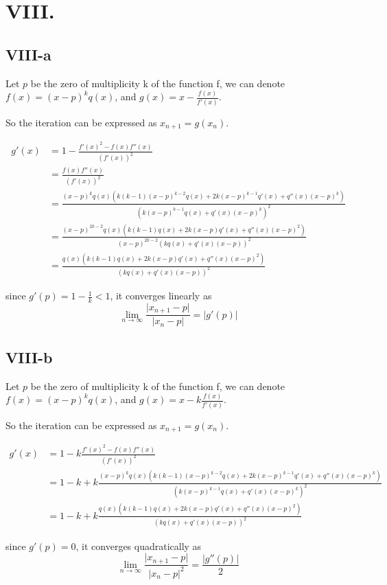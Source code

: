 \documentclass[a4paper]{article}
\begin{document}
\section*{VIII.}
\subsection*{VIII-a}
Let $p$ be the zero of multiplicity k of the function f, we can denote $f(x)=(x-p)^{k}q(x)$, and $g(x)=x-\frac{f(x)}{f'(x)}$.

So the iteration can be expressed as $x_{n+1}=g(x_{n})$.

$$
\begin{aligned}
g'(x)
&= 1-\frac{f'(x)^2-f(x)f''(x)}{(f'(x))^2} \\
&= \frac{f(x)f''(x)}{(f'(x))^2} \\
&= \frac{(x-p)^{k}q(x)(k(k-1)(x-p)^{k-2}q(x)+2k(x-p)^{k-1}q'(x)+q''(x)(x-p)^k)}{(k(x-p)^{k-1}q(x)+q'(x)(x-p)^k)^2} \\
&= \frac{(x-p)^{2k-2}q(x)(k(k-1)q(x)+2k(x-p)q'(x)+q''(x)(x-p)^2)}{(x-p)^{2k-2}(kq(x)+q'(x)(x-p))^2} \\
&= \frac{q(x)(k(k-1)q(x)+2k(x-p)q'(x)+q''(x)(x-p)^2)}{(kq(x)+q'(x)(x-p))^2} 
\end{aligned}
$$

since $g'(p)=1-\frac{1}{k}<1$,
it converges linearly as\cite{NA}
$$\lim_{n\rightarrow\infty} \frac{\lvert x_{n+1}-p \rvert}{\lvert x_{n}-p \rvert}=\lvert g'(p) \rvert$$

\subsection*{VIII-b}
Let $p$ be the zero of multiplicity k of the function f, we can denote $f(x)=(x-p)^{k}q(x)$, and $g(x)=x-k\frac{f(x)}{f'(x)}$.

So the iteration can be expressed as $x_{n+1}=g(x_{n})$.

$$
\begin{aligned}
g'(x)
&= 1-k\frac{f'(x)^2-f(x)f''(x)}{(f'(x))^2} \\
&= 1-k+k\frac{(x-p)^{k}q(x)(k(k-1)(x-p)^{k-2}q(x)+2k(x-p)^{k-1}q'(x)+q''(x)(x-p)^k)}{(k(x-p)^{k-1}q(x)+q'(x)(x-p)^k)^2} \\
&= 1-k+k\frac{q(x)(k(k-1)q(x)+2k(x-p)q'(x)+q''(x)(x-p)^2)}{(kq(x)+q'(x)(x-p))^2}
\end{aligned}
$$

since $g'(p)=0$,
it converges quadratically as\cite{NA}
$$\lim_{n\rightarrow\infty} \frac{\lvert x_{n+1}-p \rvert}{\lvert x_{n}-p \rvert ^2}= \frac{\lvert g''(p) \rvert}{2} $$

\printbibliography
\end{document}
